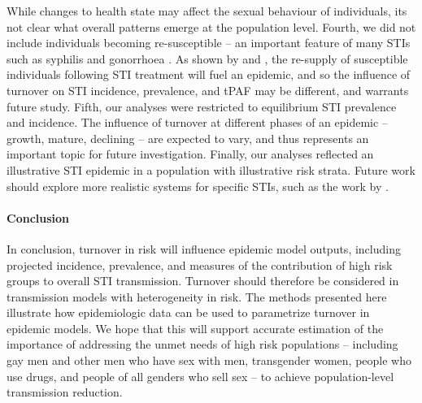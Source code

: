 While changes to health state may affect the sexual behaviour of individuals,
its not clear what overall patterns emerge at the population level.
Fourth, we did not include individuals becoming re-susceptible
-- an important feature of many STIs such as syphilis and gonorrhoea
\citep{Fenton2008}.
As shown by \citet{Fenton2008} and \citet{Pourbohloul2003},
the re-supply of susceptible individuals following STI treatment
will fuel an epidemic, and so the influence of turnover on
STI incidence, prevalence, and tPAF may be different, and warrants future study.
Fifth, our analyses were restricted to
equilibrium STI prevalence and incidence.
The influence of turnover at different phases of an epidemic
-- growth, mature, declining --
are expected to vary, and thus represents an important topic for future investigation.
Finally, our analyses reflected an illustrative STI epidemic
in a population with illustrative risk strata.
Future work should explore more realistic systems for specific STIs,
such as the work by \citet{Johnson2016}.
\paragraph{Conclusion}
In conclusion, turnover in risk will influence
epidemic model outputs, including projected incidence, prevalence, and
measures of the contribution of high risk groups to overall STI transmission.
Turnover should therefore be considered in
transmission models with heterogeneity in risk.
The methods presented here illustrate how
epidemiologic data can be used to parametrize
turnover in epidemic models.
We hope that this will support accurate estimation of
the importance of addressing the unmet needs of high risk populations
-- including
gay men and other men who have sex with men,
transgender women,
people who use drugs, and
people of all genders who sell sex
-- to achieve population-level transmission reduction.